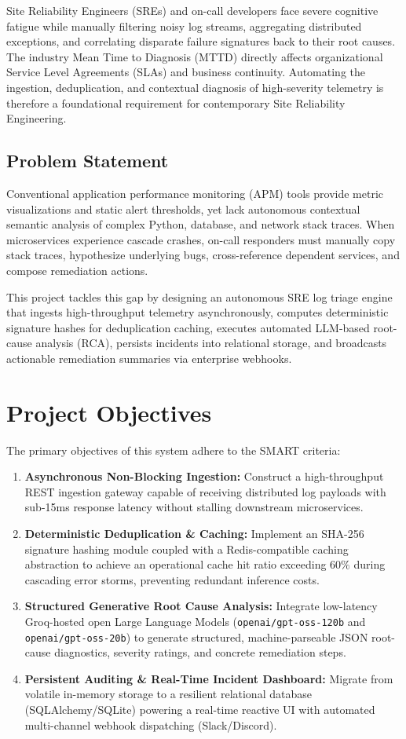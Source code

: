 \documentclass[12pt,a4paper]{report}
\begin{document}
Site Reliability Engineers (SREs) and on-call developers face severe cognitive fatigue while manually filtering noisy log streams, aggregating distributed exceptions, and correlating disparate failure signatures back to their root causes. The industry Mean Time to Diagnosis (MTTD) directly affects organizational Service Level Agreements (SLAs) and business continuity. Automating the ingestion, deduplication, and contextual diagnosis of high-severity telemetry is therefore a foundational requirement for contemporary Site Reliability Engineering.

\subsection{Problem Statement}
Conventional application performance monitoring (APM) tools provide metric visualizations and static alert thresholds, yet lack autonomous contextual semantic analysis of complex Python, database, and network stack traces. When microservices experience cascade crashes, on-call responders must manually copy stack traces, hypothesize underlying bugs, cross-reference dependent services, and compose remediation actions. 

This project tackles this gap by designing an autonomous SRE log triage engine that ingests high-throughput telemetry asynchronously, computes deterministic signature hashes for deduplication caching, executes automated LLM-based root-cause analysis (RCA), persists incidents into relational storage, and broadcasts actionable remediation summaries via enterprise webhooks.

\section{Project Objectives}
The primary objectives of this system adhere to the SMART criteria:
\begin{enumerate}
  \item \textbf{Asynchronous Non-Blocking Ingestion:} Construct a high-throughput REST ingestion gateway capable of receiving distributed log payloads with sub-15ms response latency without stalling downstream microservices.
  \item \textbf{Deterministic Deduplication \& Caching:} Implement an SHA-256 signature hashing module coupled with a Redis-compatible caching abstraction to achieve an operational cache hit ratio exceeding $60\%$ during cascading error storms, preventing redundant inference costs.
  \item \textbf{Structured Generative Root Cause Analysis:} Integrate low-latency Groq-hosted open Large Language Models (\texttt{openai/gpt-oss-120b} and \texttt{openai/gpt-oss-20b}) to generate structured, machine-parseable JSON root-cause diagnostics, severity ratings, and concrete remediation steps.
  \item \textbf{Persistent Auditing \& Real-Time Incident Dashboard:} Migrate from volatile in-memory storage to a resilient relational database (SQLAlchemy/SQLite) powering a real-time reactive UI with automated multi-channel webhook dispatching (Slack/Discord).
\end{enumerate}
\end{document}
